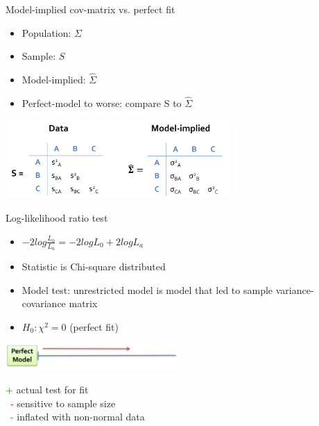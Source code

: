 \documentclass[10pt]{beamer}\usepackage[]{graphicx}\usepackage[]{xcolor}
\begin{document}
\begin{frame}{Model-implied cov-matrix vs. perfect fit}
\begin{itemize}
  \item{Population: ${\Sigma}$}
  \item{Sample: $S$}
  \item{Model-implied: ${\hat{\Sigma}}$}
  \item {Perfect-model to worse: compare S to $\hat{\Sigma}$}
\end{itemize}
\vspace*{3mm}
\includegraphics[height=3cm,keepaspectratio=T] {data_vs_model.png}
\end{frame}
%
\begin{frame}{Log-likelihood ratio test}
\begin{itemize}
\item{$-2log\frac{L_0}{L_a}=-2logL_0 + 2logL_a$}
\item{Statistic is Chi-square distributed}
\item{Model test: unrestricted model is model that led to sample variance-covariance matrix}
\item{$H_0: \chi^2 = 0$ (perfect fit)}
\end{itemize}
\vspace*{5mm}
\includegraphics[height=1cm,keepaspectratio=T] {perfect_fit.png}
\hfill
\vspace*{5mm}

\textcolor{green}{+} actual test for fit\\
\ \textcolor{red}{-} sensitive to sample size\\
\ \textcolor{red}{-} inflated with non-normal data\\
\vspace*{3mm}

\end{frame}
\end{document}
